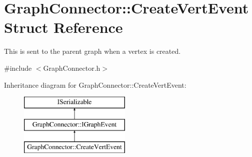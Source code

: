 \hypertarget{struct_graph_connector_1_1_create_vert_event}{}\section{Graph\+Connector\+:\+:Create\+Vert\+Event Struct Reference}
\label{struct_graph_connector_1_1_create_vert_event}


This is sent to the parent graph when a vertex is created.  




{\ttfamily \#include $<$Graph\+Connector.\+h$>$}

Inheritance diagram for Graph\+Connector\+:\+:Create\+Vert\+Event\+:\begin{figure}[H]
\begin{center}
\leavevmode
\includegraphics[height=3.000000cm]{struct_graph_connector_1_1_create_vert_event}
\end{center}
\end{figure}
